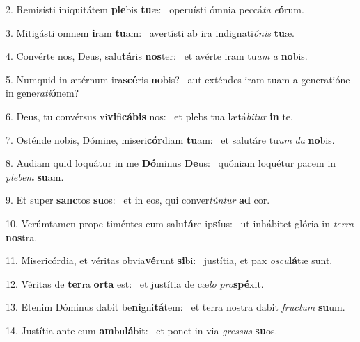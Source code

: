 2. Remisísti iniquitátem \textbf{ple}bis \textbf{tu}æ: \ast\  operuísti ómnia peccá\textit{ta} \textit{e}\textbf{ó}rum.\

3. Mitigásti omnem \textbf{i}ram \textbf{tu}am: \ast\  avertísti ab ira indignati\textit{ó}\textit{nis} \textbf{tu}æ.\

4. Convérte nos, Deus, salu\textbf{tá}ris \textbf{nos}ter: \ast\  et avérte iram tu\textit{am} \textit{a} \textbf{no}bis.\

5. Numquid in ætérnum ira\textbf{scé}ris \textbf{no}bis? \ast\  aut exténdes iram tuam a generatióne in gene\textit{ra}\textit{ti}\textbf{ó}nem?\

6. Deus, tu convérsus vi\textbf{vi}fi\textbf{cá}\textbf{bis} nos: \ast\  et plebs tua lætá\textit{bi}\textit{tur} \textbf{in} te.\

7. Osténde nobis, Dómine, miseri\textbf{cór}diam \textbf{tu}am: \ast\  et salutáre tu\textit{um} \textit{da} \textbf{no}bis.\

8. Audiam quid loquátur in me \textbf{Dó}minus \textbf{De}us: \ast\  quóniam loquétur pacem in \textit{ple}\textit{bem} \textbf{su}am.\

9. Et super \textbf{sanc}tos \textbf{su}os: \ast\  et in eos, qui conver\textit{tún}\textit{tur} \textbf{ad} cor.\

10. Verúmtamen prope timéntes eum salu\textbf{tá}re ip\textbf{sí}us: \ast\  ut inhábitet glória in \textit{ter}\textit{ra} \textbf{nos}tra.\

11. Misericórdia, et véritas obvia\textbf{vé}runt \textbf{si}bi: \ast\  justítia, et pax \textit{os}\textit{cu}\textbf{lá}tæ sunt.\

12. Véritas de \textbf{ter}ra \textbf{or}\textbf{ta} est: \ast\  et justítia de cæ\textit{lo} \textit{pro}\textbf{spé}xit.\

13. Etenim Dóminus dabit be\textbf{ni}gni\textbf{tá}tem: \ast\  et terra nostra dabit \textit{fruc}\textit{tum} \textbf{su}um.\

14. Justítia ante eum \textbf{am}bu\textbf{lá}bit: \ast\  et ponet in via \textit{gres}\textit{sus} \textbf{su}os.\

